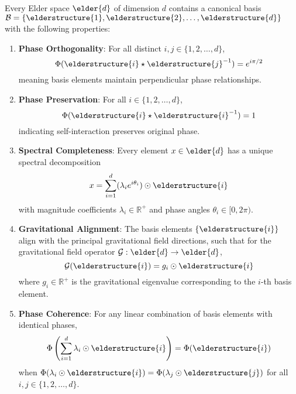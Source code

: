 \begin{theorem}
\label{thm:structural_elements}
Every Elder space $\elder{d}$ of dimension $d$ contains a canonical basis $\mathcal{B} = \{\elderstructure{1}, \elderstructure{2}, \ldots, \elderstructure{d}\}$ with the following properties:
\begin{enumerate}
    \item \textbf{Phase Orthogonality}: For all distinct $i, j \in \{1, 2, \ldots, d\}$,
    \begin{equation}
        \Phi(\elderstructure{i} \star \elderstructure{j}^{-1}) = e^{i\pi/2}
    \end{equation}
    meaning basis elements maintain perpendicular phase relationships.
    
    \item \textbf{Phase Preservation}: For all $i \in \{1, 2, \ldots, d\}$,
    \begin{equation}
        \Phi(\elderstructure{i} \star \elderstructure{i}^{-1}) = 1
    \end{equation}
    indicating self-interaction preserves original phase.
    
    \item \textbf{Spectral Completeness}: Every element $x \in \elder{d}$ has a unique spectral decomposition
    \begin{equation}
        x = \sum_{i=1}^{d} (\lambda_i e^{i\theta_i}) \odot \elderstructure{i}
    \end{equation}
    with magnitude coefficients $\lambda_i \in \mathbb{R}^+$ and phase angles $\theta_i \in [0, 2\pi)$.
    
    \item \textbf{Gravitational Alignment}: The basis elements $\{\elderstructure{i}\}$ align with the principal gravitational field directions, such that for the gravitational field operator $\mathcal{G}: \elder{d} \rightarrow \elder{d}$,
    \begin{equation}
        \mathcal{G}(\elderstructure{i}) = g_i \odot \elderstructure{i}
    \end{equation}
    where $g_i \in \mathbb{R}^+$ is the gravitational eigenvalue corresponding to the $i$-th basis element.
    
    \item \textbf{Phase Coherence}: For any linear combination of basis elements with identical phases,
    \begin{equation}
        \Phi\left(\sum_{i=1}^{d} \lambda_i \odot \elderstructure{i}\right) = \Phi(\elderstructure{i})
    \end{equation}
    when $\Phi(\lambda_i \odot \elderstructure{i}) = \Phi(\lambda_j \odot \elderstructure{j})$ for all $i,j \in \{1,2,\ldots,d\}$.
\end{enumerate}
\end{theorem}

